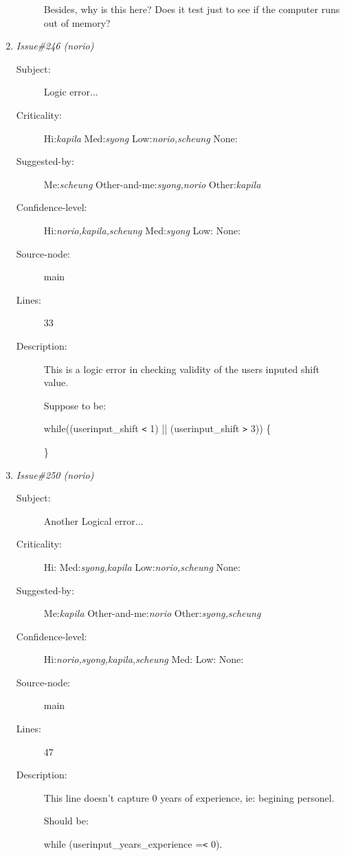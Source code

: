 \begin{enumerate}
\begin{description}
 Besides, why is this here?  Does it test just to see if
 the computer runs out of memory?
\end{description}
\item {\it Issue\#246 (norio)}
\begin{description}
\item [Subject:] Logic error...
\item [Criticality:] Hi:{\it kapila} Med:{\it syong} Low:{\it norio,scheung} None:{\it }
\item [Suggested-by:] Me:{\it scheung} Other-and-me:{\it syong,norio} Other:{\it kapila}
\item [Confidence-level:] Hi:{\it norio,kapila,scheung} Med:{\it syong} Low:{\it } None:{\it }
\item [Source-node:] main

\item [Lines:] 33

\item [Description:] This is a logic error in checking validity of the users
 inputed shift value.

 Suppose to be:

 while((userinput\_shift {\tt <} 1) || (userinput\_shift {\tt >} 3))
 \{

 \}
\end{description}
\item {\it Issue\#250 (norio)}
\begin{description}
\item [Subject:] Another Logical error...
\item [Criticality:] Hi:{\it } Med:{\it syong,kapila} Low:{\it norio,scheung} None:{\it }
\item [Suggested-by:] Me:{\it kapila} Other-and-me:{\it norio} Other:{\it syong,scheung}
\item [Confidence-level:] Hi:{\it norio,syong,kapila,scheung} Med:{\it } Low:{\it } None:{\it }
\item [Source-node:] main

\item [Lines:] 47

\item [Description:] This line doesn't capture 0 years of experience, ie:
 begining personel.

 Should be:

 while (userinput\_years\_experience ={\tt <} 0).
\end{description}
\end{enumerate}
